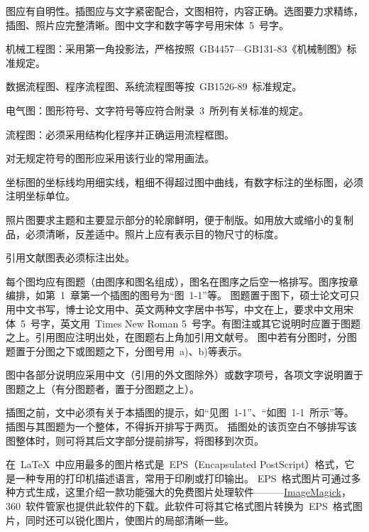 

图应有自明性。插图应与文字紧密配合，文图相符，内容正确。选图要力求精练，插图、照片应完整清晰。图中文字和数字等字号用宋体~5~号字。

机械工程图：采用第一角投影法，严格按照~GB4457---GB131-83《机械制图》标准规定。

数据流程图、程序流程图、系统流程图等按~GB1526-89~标准规定。

电气图：图形符号、文字符号等应符合附录~3~所列有关标准的规定。

流程图：必须采用结构化程序并正确运用流程框图。

对无规定符号的图形应采用该行业的常用画法。

坐标图的坐标线均用细实线，粗细不得超过图中曲线，有数字标注的坐标图，必须注明坐标单位。

照片图要求主题和主要显示部分的轮廓鲜明，便于制版。如用放大或缩小的复制品，必须清晰，反差适中。照片上应有表示目的物尺寸的标度。

引用文献图表必须标注出处。


每个图均应有图题（由图序和图名组成），图名在图序之后空一格排写。图序按章编排，如第~1~章第一个插图的图号为“图~1-1”等。
图题置于图下，硕士论文可只用中文书写，博士论文用中、英文两种文字居中书写，中文在上，要求中文用宋体~5~号字，英文用~Times New Roman 5~号字。有图注或其它说明时应置于图题之上。引用图应注明出处，在图题右上角加引用文献号。
图中若有分图时，分图题置于分图之下或图题之下，分图号用~a)、b)等表示。

图中各部分说明应采用中文（引用的外文图除外）或数字项号，各项文字说明置于图题之上（有分图题者，置于分图题之上）。

插图之前，文中必须有关于本插图的提示，如“见图~1-1”、“如图~1-1~所示”等。插图与其图题为一个整体，不得拆开排写于两页。
插图处的该页空白不够排写该图整体时，则可将其后文字部分提前排写，将图移到次页。

在~\LaTeX~中应用最多的图片格式是~EPS（Encapsulated PostScript）格式，它是一种专用的打印机描述语言，常用于印刷或打印输出。
EPS~格式图片可通过多种方式生成，这里介绍一款功能强大的免费图片处理软件———\href{http://www.imagemagick.org/}{ImageMagick}，
360~软件管家也提供此软件的下载。此软件可将其它格式图片转换为~EPS~格式图片，同时还可以锐化图片，使图片的局部清晰一些。

